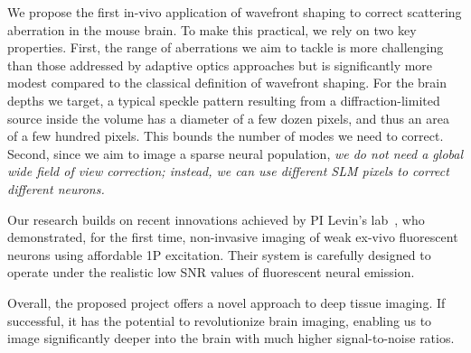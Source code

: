  
 We propose the first in-vivo application of wavefront shaping to correct scattering aberration in the mouse brain. To make this practical, we rely on two key properties. First, the range of aberrations we aim to tackle is more challenging than those addressed by adaptive optics approaches but is significantly more modest compared to the classical definition of wavefront shaping. For the brain depths we target, a typical speckle pattern resulting from a diffraction-limited source inside the volume has a diameter of a few dozen pixels, and thus an area of a few hundred pixels. This bounds the number of modes we need to correct. Second, since we aim to image a sparse neural population, {\em we do not need a global wide field of view correction; instead, we can use different SLM pixels to correct different neurons.}
 
 Our research builds on recent innovations achieved by PI Levin's lab~\cite{DrorNatureComm24}, who demonstrated, for the first time, non-invasive imaging of weak ex-vivo fluorescent neurons using affordable 1P excitation. Their system is carefully designed to operate under the realistic low SNR values of fluorescent neural emission.
  
Overall, the proposed project offers a novel approach to deep tissue imaging. If successful, it has the potential to revolutionize brain imaging, enabling us to image significantly deeper into the brain with much higher signal-to-noise ratios.
 
 
% 
%  
%
%




